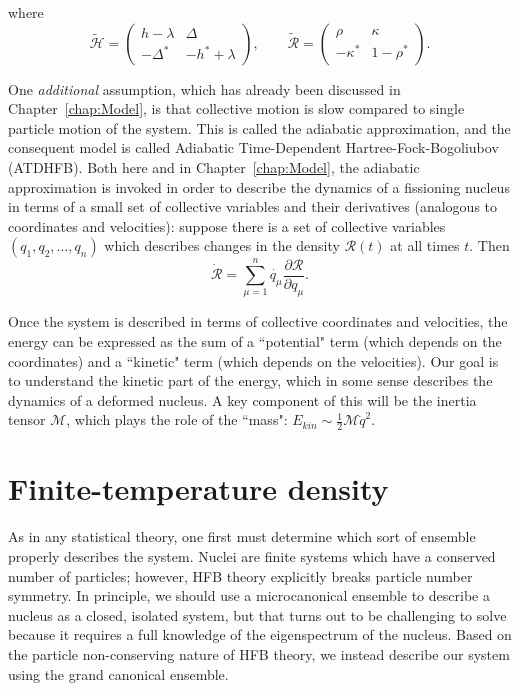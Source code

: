 \noindent where
\begin{equation}
\mathcal{\tilde{H}} = 
\left(\begin{array}{cc}
h-\lambda & \Delta \\
-\Delta^* & -h^*+\lambda
\end{array}\right), 
\qquad \mathcal{\tilde{R}} = 
\left(\begin{array}{cc}
\rho & \kappa \\
-\kappa^* & 1-\rho^*
\end{array}\right).
\end{equation}

One \textit{additional} assumption, which has already been discussed in Chapter~\ref{chap:Model}, is that collective motion is slow compared to single particle motion of the system. This is called the adiabatic approximation, and the consequent model is called Adiabatic Time-Dependent Hartree-Fock-Bogoliubov (ATDHFB). Both here and in Chapter~\ref{chap:Model}, the adiabatic approximation is invoked in order to describe the dynamics of a fissioning nucleus in terms of a small set of collective variables and their derivatives (analogous to coordinates and velocities): suppose there is a set of collective variables $(q_1,q_2,\dots,q_n)$ which describes changes in the density $\mathcal{R}(t)$ at all times $t$. Then
\begin{equation}\label{eqn:RdotQdot}
\mathcal{\dot{R}} = \sum_{\mu=1}^{n}\dot{q_\mu}\frac{\partial\mathcal{R}}{\partial q_\mu}.
\end{equation}

Once the system is described in terms of collective coordinates and velocities, the energy can be expressed as the sum of a ``potential" term (which depends on the coordinates) and a ``kinetic" term (which depends on the velocities). Our goal is to understand the kinetic part of the energy, which in some sense describes the dynamics of a deformed nucleus. A key component of this will be the inertia tensor $\mathcal{M}$, which plays the role of the ``mass": $E_{kin}\sim\frac{1}{2}\mathcal{M}\dot{q}^2$.

\section{Finite-temperature density}

As in any statistical theory, one first must determine which sort of ensemble properly describes the system. Nuclei are finite systems which have a conserved number of particles; however, HFB theory explicitly breaks particle number symmetry. In principle, we should use a microcanonical ensemble to describe a nucleus as a closed, isolated system, but that turns out to be challenging to solve because it requires a full knowledge of the eigenspectrum of the nucleus. Based on the particle non-conserving nature of HFB theory, we instead describe our system using the grand canonical ensemble.

